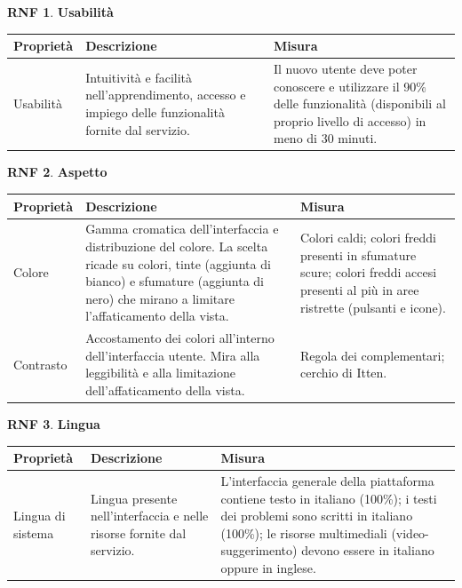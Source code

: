\documentclass[11pt, a4paper]{article}
\theoremstyle{definition} %
\newtheorem{nonfuncreq}{RNF} %
\begin{document}
\begin{nonfuncreq}
    \textbf{Usabilità }
    \begin{center}
        \footnotesize
        \begin{tabularx}{\textwidth}{|X||X||X|}
            \hline
            \cellcolor{red!70}Proprietà & \cellcolor{red!70}Descrizione & \cellcolor{red!70}Misura\\
            \hline
            Usabilità & Intuitività e facilità nell'apprendimento, accesso e impiego delle funzionalità fornite dal servizio. & Il nuovo utente deve poter conoscere e utilizzare il 90\% delle funzionalità (disponibili al proprio livello di accesso) in meno di 30 minuti.\\
            \hline
        \end{tabularx}
    \end{center}
\end{nonfuncreq}

\begin{nonfuncreq}
    \textbf{Aspetto }
    \begin{center}
        \footnotesize
        \begin{tabularx}{\textwidth}{|X||X||X|}
            \hline
            \cellcolor{red!70}Proprietà & \cellcolor{red!70}Descrizione & \cellcolor{red!70}Misura\\
            \hline
            Colore & Gamma cromatica dell'interfaccia e distribuzione del colore. La scelta ricade su colori, tinte (aggiunta di bianco) e sfumature (aggiunta di nero) che mirano a limitare l'affaticamento della vista. & Colori caldi; colori freddi presenti in sfumature scure; colori freddi accesi presenti al più in aree ristrette (pulsanti e icone).\\
            \hline
            Contrasto & Accostamento dei colori all'interno dell'interfaccia utente. Mira alla leggibilità e alla limitazione dell'affaticamento della vista. & Regola dei complementari; cerchio di Itten.\\
            \hline
        \end{tabularx}
    \end{center}
\end{nonfuncreq}

\begin{nonfuncreq}
    \textbf{Lingua }
    \begin{center}
        \footnotesize
        \begin{tabularx}{\textwidth}{|X||X||X|}
            \hline
            \cellcolor{red!70}Proprietà & \cellcolor{red!70}Descrizione & \cellcolor{red!70}Misura\\
            \hline
            Lingua di sistema           & Lingua presente nell'interfaccia e nelle risorse fornite dal servizio. & L'interfaccia generale della piattaforma contiene testo in italiano (100\%); i testi dei problemi sono scritti in italiano (100\%); le risorse multimediali (video-suggerimento) devono essere in italiano oppure in inglese.\\
            \hline
        \end{tabularx}
    \end{center}
\end{nonfuncreq}
\end{document}
